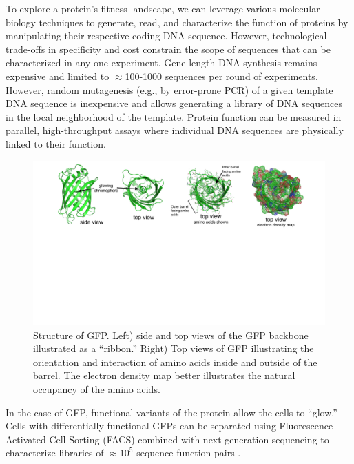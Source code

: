 To explore a protein’s fitness landscape, we can leverage various molecular biology techniques to generate, read, and characterize the function of proteins by manipulating their respective coding DNA sequence. However, technological trade-offs in specificity and cost constrain the scope of sequences that can be characterized in any one experiment. Gene-length DNA synthesis remains expensive and limited to $\approx$100-1000 sequences per round of experiments. However, random mutagenesis (e.g., by error-prone PCR) of a given template DNA sequence is inexpensive and allows generating a library of DNA sequences in the local neighborhood of the template. Protein function can be measured in parallel, high-throughput assays where individual DNA sequences are physically linked to their function.

\begin{figure}[t]
  \includegraphics[width=1\linewidth,page=1,trim={2cm 9cm 2cm 0}]{figures/2018-05-09-NIPS_2018_Figures.pdf}
  \caption[Structure of GFP]{\small{
    Structure of GFP. Left) side and top views of the GFP backbone illustrated as a ``ribbon.'' Right) Top views of GFP illustrating the orientation and interaction of amino acids inside and outside of the barrel. The electron density map better illustrates the natural occupancy of the amino acids.}
  }
  \label{gfp-struct}
  \vspace{-0.6cm}
\end{figure}

In the case of GFP, functional variants of the protein allow the cells to ``glow.'' Cells with differentially functional GFPs can be separated using Fluorescence-Activated Cell Sorting (FACS) combined with next-generation sequencing to characterize libraries of $\approx10^5$ sequence-function pairs \cite{Kosuri2013-vt, Sarkisyan2016-cr}.

